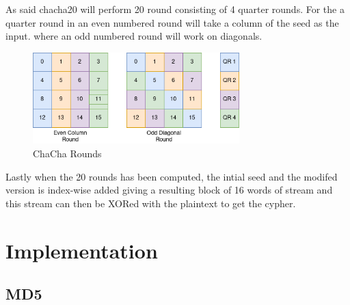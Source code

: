 \documentclass[a4paper]{article}
\begin{document}
As said chacha20 will perform 20 round consisting of 4 quarter rounds. For the a quarter round in an even numbered round will take a column of the seed as the input. where an odd numbered round will work on diagonals.
\begin{figure}[!htb]
\centering
\includegraphics[width=8cm]{Background/diagonal.png}
\caption{ChaCha Rounds}
\label{fig:ChaChaRound}
\end{figure}
Lastly when the 20 rounds has been computed, the intial seed and the modifed version is index-wise added giving a resulting block of 16 words of stream and this stream can then be XORed with the plaintext to get the cypher.

\section{Implementation}
\label{sec:orgbb29797}
\subsection{MD5}
\label{sec:org5ec5acf}
\end{document}
